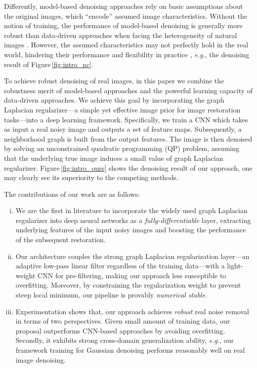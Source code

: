 \documentclass[10pt,twocolumn,letterpaper]{article}
\begin{document}
Differently, model-based denoising approaches rely on basic assumptions about the original images, which ``encode'' assumed image characteristics. 
Without the notion of training, the performance of model-based denoising is generally more robust than data-driven approaches when facing the heterogeneity of natural images \cite{dong2018denoising}. 
However, the assumed characteristics may not perfectly hold in the real world, hindering their performance and flexibility in practice \cite{milanfar2013tour}, {\it e.g.}, the denoising result of Figure\,\ref{fig:intro_nc}.

To achieve robust denoising of real images, in this paper we combine the robustness merit of model-based approaches and the powerful learning capacity of data-driven approaches. 
We achieve this goal by incorporating the graph Laplacian regularizer---a simple yet effective image prior for image restoration tasks---into a deep learning framework. 
Specifically, we train a CNN which takes as input a real noisy image and outputs a set of feature maps. 
Subsequently, a neighborhood graph is built from the output features. 
The image is then denoised by solving an unconstrained quadratic programming (QP) problem, assuming that the underlying true image induces a small value of graph Laplacian regularizer. 
Figure\,\ref{fig:intro_ours} shows the denoising result of our approach, one may clearly see its superiority to the competing methods.

The contributions of our work are as follows:
\begin{enumerate}[(i)]
\item We are the first in literature to incorporate the widely used graph Laplacian regularizer into deep neural networks as a \textit{fully-differentiable} layer, extracting underlying features of the input noisy images and boosting the performance of the subsequent restoration.
\item Our architecture couples the strong graph Laplacian regularization layer---an adaptive low-pass linear filter regardless of the training data---with a light-weight CNN for pre-filtering, making our approach less susceptible to overfitting. 
Moreover, by constraining the regularization weight to prevent steep local minimum, our pipeline is provably {\it numerical stable}.
\item Experimentation shows that, our approach achieves \emph{robust} real noise removal in terms of two perspectives. 
Given small amount of training data, our proposal outperforms CNN-based approaches by avoiding overfitting. 
Secondly, it exhibits strong cross-domain generalization ability, {\it e.g.},  our framework training for Gaussian denoising performs reasonably well on real image denoising.
\end{enumerate}
\end{document}
